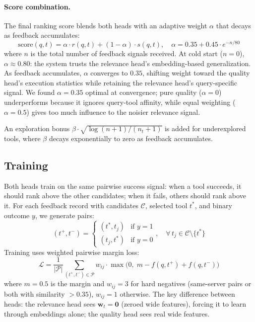 \documentclass{article}
\begin{document}
\paragraph{Score combination.} The final ranking score blends both heads with an adaptive weight $\alpha$ that decays as feedback accumulates:
%
\begin{equation}
  \text{score}(q, t) = \alpha \cdot r(q, t) + (1 - \alpha) \cdot s(q, t), \quad \alpha = 0.35 + 0.45 \cdot e^{-n/80}
\end{equation}
%
where $n$ is the total number of feedback signals received. At cold start ($n{=}0$), $\alpha \approx 0.80$: the system trusts the relevance head's embedding-based generalization. As feedback accumulates, $\alpha$ converges to $0.35$, shifting weight toward the quality head's execution statistics while retaining the relevance head's query-specific signal. We found $\alpha{=}0.35$ optimal at convergence; pure quality ($\alpha{=}0$) underperforms because it ignores query-tool affinity, while equal weighting ($\alpha{=}0.5$) gives too much influence to the noisier relevance signal.

An exploration bonus $\beta \cdot \sqrt{\log(n+1) / (n_t + 1)}$ is added for underexplored tools, where $\beta$ decays exponentially to zero as feedback accumulates.

\subsection{Training}

Both heads train on the same pairwise success signal: when a tool succeeds, it should rank above the other candidates; when it fails, others should rank above it. For each feedback record with candidates $\mathcal{C}$, selected tool $t^*$, and binary outcome $y$, we generate pairs:
%
\begin{equation}
  (t^+, t^-) = \begin{cases} (t^*, t_j) & \text{if } y = 1 \\ (t_j, t^*) & \text{if } y = 0 \end{cases}, \quad \forall\, t_j \in \mathcal{C} \setminus \{t^*\}
\end{equation}
%
Training uses weighted pairwise margin loss:
%
\begin{equation}
  \mathcal{L} = \frac{1}{|\mathcal{P}|} \sum_{(t^+, t^-) \in \mathcal{P}} w_{ij} \cdot \max\bigl(0,\; m - f(q, t^+) + f(q, t^-)\bigr)
\end{equation}
%
where $m{=}0.5$ is the margin and $w_{ij}{=}3$ for hard negatives (same-server pairs or both with similarity $> 0.35$), $w_{ij}{=}1$ otherwise. The key difference between heads: the relevance head sees $\mathbf{w}_t = \mathbf{0}$ (zeroed wide features), forcing it to learn through embeddings alone; the quality head sees real wide features.
\end{document}
